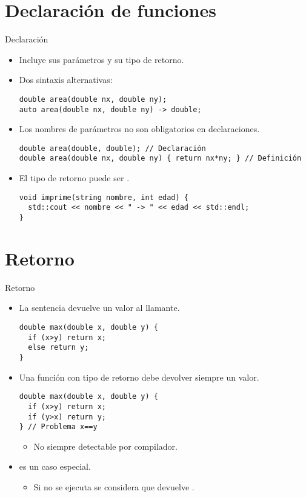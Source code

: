 \section{Declaración de funciones}

\begin{frame}[fragile]{Declaración}
\begin{itemize}
  \item Incluye sus parámetros y su tipo de retorno.
  \item Dos sintaxis alternativas:
\begin{lstlisting}
double area(double nx, double ny);
auto area(double nx, double ny) -> double;
\end{lstlisting}
  \item Los nombres de parámetros no son obligatorios en declaraciones.
\begin{lstlisting}
double area(double, double); // Declaración
double area(double nx, double ny) { return nx*ny; } // Definición
\end{lstlisting}
  \item El tipo de retorno puede ser .
\begin{lstlisting}
void imprime(string nombre, int edad) {
  std::cout << nombre << " -> " << edad << std::endl;
}
\end{lstlisting}
\end{itemize}
\end{frame}

\section{Retorno}

\begin{frame}[fragile]{Retorno}
\begin{itemize}
  \item La sentencia  devuelve un valor al llamante.
\begin{lstlisting}
double max(double x, double y) {
  if (x>y) return x;
  else return y;
}
\end{lstlisting}
  \item Una función con tipo de retorno debe devolver siempre un valor.
\begin{lstlisting}
double max(double x, double y) {
  if (x>y) return x;
  if (y>x) return y;
} // Problema x==y
\end{lstlisting}
    \begin{itemize}
      \item No siempre detectable por compilador.
    \end{itemize}
  \item {} es un caso especial.
    \begin{itemize}
      \item Si no se ejecuta  se considera que devuelve .
    \end{itemize}
\end{itemize}
\end{frame}

